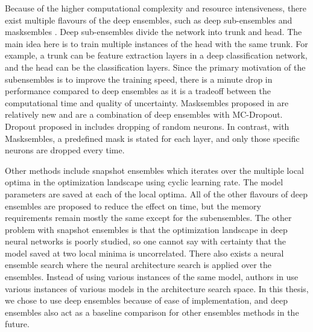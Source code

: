    Because of the higher computational complexity and resource intensiveness, there exist multiple flavours of the deep ensembles, such as deep sub-ensembles \cite{deep_subensembles} and masksembles \cite{masksembles}.
    Deep sub-ensembles divide the network into trunk and head.
    The main idea here is to train multiple instances of the head with the same trunk. For example, a trunk can be feature extraction layers in a deep classification network, and the head can be the classification layers.
    Since the primary motivation of the subensembles is to improve the training speed, there is a minute drop in performance compared to deep ensembles as it is a tradeoff between the computational time and quality of uncertainty.
    Masksembles proposed in \cite{masksembles} are relatively new and are a combination of deep ensembles with MC-Dropout.
    Dropout proposed in \cite{Dropout} includes dropping of random neurons. In contrast, with Masksembles, a predefined mask is stated for each layer, and only those specific neurons are dropped every time.

    Other methods include snapshot ensembles \cite{snapshot_ensembles} which iterates over the multiple local optima in the optimization landscape using cyclic learning rate. 
    The model parameters are saved at each of the local optima. 
    All of the other flavours of deep ensembles are proposed to reduce the effect on time, but the memory requirements remain mostly the same except for the subensembles.
    The other problem with snapshot ensembles is that the optimization landscape in deep neural networks is poorly studied, so one cannot say with certainty that the model saved at two local minima is uncorrelated.
    There also exists a neural ensemble search \cite{NAS_Ensembles} where the neural architecture search is applied over the ensembles.
    Instead of using various instances of the same model, authors in \cite{NAS_Ensembles} use various instances of various models in the architecture search space.
    In this thesis, we chose to use deep ensembles because of ease of implementation, and deep ensembles also act as a baseline comparison for other ensembles methods in the future.

